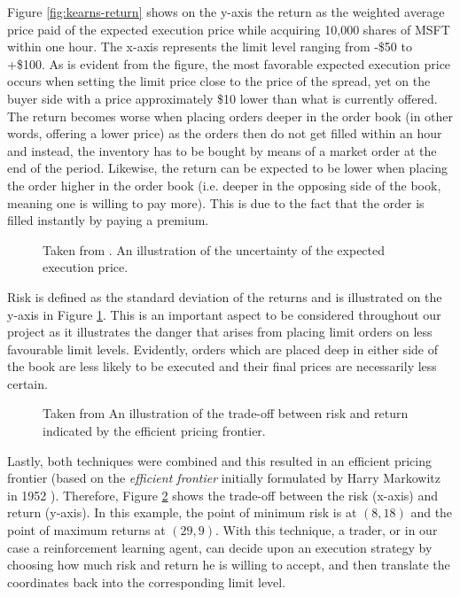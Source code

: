 Figure \ref{fig:kearns-return} shows on the y-axis the return as the weighted average price paid of the expected execution price while acquiring 10,000 shares of MSFT within one hour.
The x-axis represents the limit level ranging from -\$50 to +\$100.
As is evident from the figure, the most favorable expected execution price occurs when setting the limit price close to the price of the spread, yet on the buyer side with a price approximately \$10 lower than what is currently offered.
The return becomes worse when placing orders deeper in the order book (in other words, offering a lower price) as the orders then do not get filled within an hour and instead, the inventory has to be bought by means of a market order at the end of the period.
Likewise, the return can be expected to be lower when placing the order higher in the order book (i.e. deeper in the opposing side of the book, meaning one is willing to pay more).
This is due to the fact that the order is filled instantly by paying a premium.

\begin{figure}[H]
    \centering
    \caption{Taken from \cite{nevmyvaka2005electronic}. An illustration of the uncertainty of the expected execution price.}
    \label{fig:kearns-std}
\end{figure}

Risk is defined as the standard deviation of the returns and is illustrated on the y-axis in Figure \ref{fig:kearns-std}.
This is an important aspect to be considered throughout our project as it illustrates the danger that arises from placing limit orders on less favourable limit levels.
Evidently, orders which are placed deep in either side of the book are less likely to be executed and their final prices are necessarily less certain.

\begin{figure}[H]
    \centering
    \caption{Taken from \cite{nevmyvaka2005electronic} An illustration of the trade-off between risk and return indicated by the efficient pricing frontier.}
    \label{fig:kearns-frontier}
\end{figure}

Lastly, both techniques were combined and this resulted in an efficient pricing frontier (based on the \textit{efficient frontier} initially formulated by Harry Markowitz in 1952 \cite{markowitz1952portfolio}). 
Therefore, Figure \ref{fig:kearns-frontier} shows the trade-off between the risk (x-axis) and return (y-axis).
In this example, the point of minimum risk is at $(8, 18)$ and the point of maximum returns at $(29, 9)$.
With this technique, a trader, or in our case a reinforcement learning agent, can decide upon an execution strategy by choosing how much risk and return he is willing to accept, and then translate the coordinates back into the corresponding limit level.

